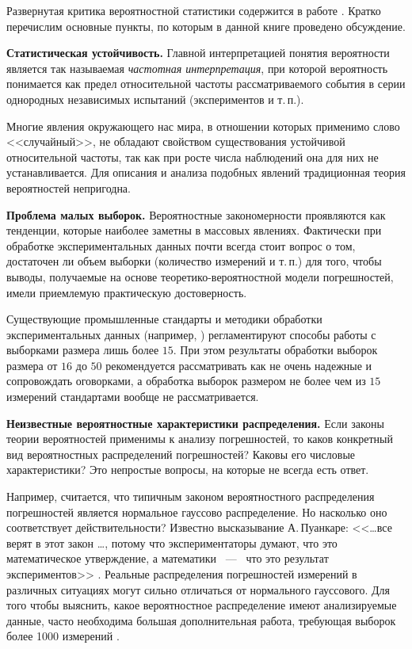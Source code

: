 \documentclass[a5paper,openany]{book}
\begin{document}
{Развернутая критика вероятностной статистики  содержится в работе \cite{MetodikaBook}. Кратко перечислим основные пункты, по которым в  данной книге проведено обсуждение.

{\bf Статистическая устойчивость.} 
Главной интерпретацией   
понятия вероятности является так называемая \emph{частотная интерпретация}, при 
которой вероятность понимается как предел относительной частоты рассматриваемого 
события в серии однородных независимых испытаний (экспериментов и т.\,п.). 

Многие явления окружающего нас мира, в отношении которых применимо слово <<случайный>>, не обладают свойством существования устойчивой относительной 
частоты, так как при росте числа наблюдений она для них не устанавливается. 
Для описания и анализа подобных явлений традиционная теория вероятностей непригодна. 

{\bf Проблема малых выборок.} 
Вероятностные закономерности проявляются как тенденции, которые наиболее заметны 
в массовых явлениях.  Фактически
при обработке экспериментальных данных почти всегда стоит вопрос о том, достаточен ли 
объем выборки (количество измерений и т.\,п.) для того, чтобы выводы, получаемые 
на основе теоретико-вероятностной модели погрешностей, имели приемлемую практическую 
достоверность. 

Существующие промышленные стандарты и методики обработки экспериментальных данных (например, \cite{GUM, JCGM102RU, GOSTDirect}) регламентируют способы работы с выборками размера лишь 
более $15$. При этом результаты обработки выборок размера от $16$ до $50$ рекомендуется 
рассматривать как не очень надежные и сопровождать оговорками, а обработка выборок 
размером не более чем из $15$ измерений стандартами вообще не рассматривается. 

{\bf Неизвестные вероятностные характеристики распределения.} 
Если законы теории вероятностей применимы к анализу погрешностей, то каков конкретный 
вид вероятностных распределений погрешностей? Каковы его числовые характеристики? 
Это непростые вопросы, на которые  не всегда есть ответ.

Например, считается, что типичным законом вероятностного распределения погрешностей 
является нормальное гауссово распределение. Но насколько оно соответствует действительности?   
Известно высказывание А.\,Пуанкаре: <<\ldots все верят в этот закон  \ldots,  потому что экспериментаторы думают, 
что это математическое утверждение, а математики ~---~ что это результат экспериментов>> \cite{Poincare}.  
Реальные 
распределения погрешностей измерений в различных ситуациях могут сильно отличаться 
от нормального гауссового.
Для того чтобы выяснить, какое вероятностное распределение имеют 
анализируемые данные, часто необходима большая дополнительная работа, требующая выборок более 1000 измерений \cite{Orlov2016}. 

}
\end{document}
